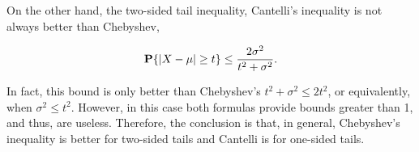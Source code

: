 On the other hand, the two-sided tail inequality, Cantelli's inequality is not always better than Chebyshev,

\begin{corollary}
  \[\P\{|X-\mu| \geq t\} \leq \frac{2\sigma^2}{t^2 + \sigma^2}. \] 
\end{corollary}

In fact, this bound is only better than Chebyshev's $t^2+\sigma^2 \leq 2t^2$, or equivalently, when $\sigma^2 \leq t^2$. However, in this case both formulas provide bounds greater than 1, and thus, are useless. Therefore, the conclusion is that, in general, Chebyshev's inequality is better for two-sided tails and Cantelli is for one-sided tails.